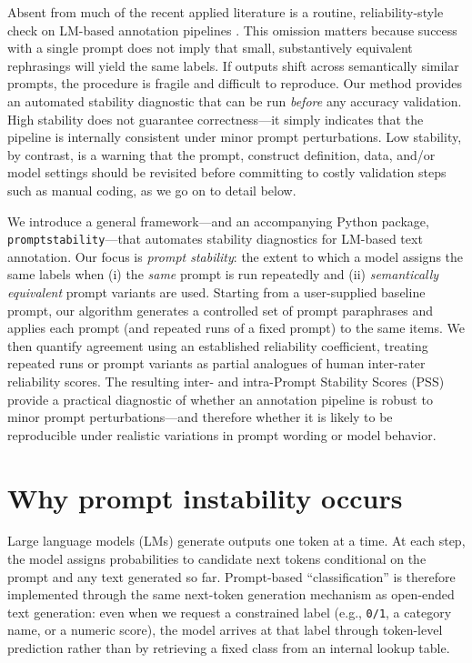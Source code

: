 \documentclass{article}
\begin{document}
Absent from much of the recent applied literature is a routine, reliability-style check on LM-based annotation pipelines \citep{reiss2023testing, Ollion2023, sclar2023quantifying}. This omission matters because success with a single prompt does not imply that small, substantively equivalent rephrasings will yield the same labels. If outputs shift across semantically similar prompts, the procedure is fragile and difficult to reproduce. Our method provides an automated stability diagnostic that can be run \emph{before} any accuracy validation. High stability does not guarantee correctness---it simply indicates that the pipeline is internally consistent under minor prompt perturbations. Low stability, by contrast, is a warning that the prompt, construct definition, data, and/or model settings should be revisited before committing to costly validation steps such as manual coding, as we go on to detail below.

We introduce a general framework---and an accompanying Python package, \texttt{promptstability}---that automates stability diagnostics for LM-based text annotation. Our focus is \textit{prompt stability}: the extent to which a model assigns the same labels when (i) the \emph{same} prompt is run repeatedly and (ii) \emph{semantically equivalent} prompt variants are used. Starting from a user-supplied baseline prompt, our algorithm generates a controlled set of prompt paraphrases and applies each prompt (and repeated runs of a fixed prompt) to the same items. We then quantify agreement using an established reliability coefficient, treating repeated runs or prompt variants as partial analogues of human inter-rater reliability scores. The resulting inter- and intra-Prompt Stability Scores (PSS) provide a practical diagnostic of whether an annotation pipeline is robust to minor prompt perturbations---and therefore whether it is likely to be reproducible under realistic variations in prompt wording or model behavior.

\section{Why prompt instability occurs}

Large language models (LMs) generate outputs one token at a time. At each step, the model assigns probabilities to candidate next tokens conditional on the prompt and any text generated so far. Prompt-based ``classification'' is therefore implemented through the same next-token generation mechanism as open-ended text generation: even when we request a constrained label (e.g., \texttt{0/1}, a category name, or a numeric score), the model arrives at that label through token-level prediction rather than by retrieving a fixed class from an internal lookup table.
\end{document}
